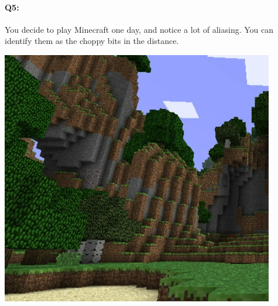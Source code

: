 
\pagebreak
\paragraph{Q5:} You decide to play Minecraft one day, and notice a lot of aliasing. You can identify them as the choppy bits in the distance.

\includegraphics[width=\textwidth * 7/10]{images/aliased-minecraft.png}




